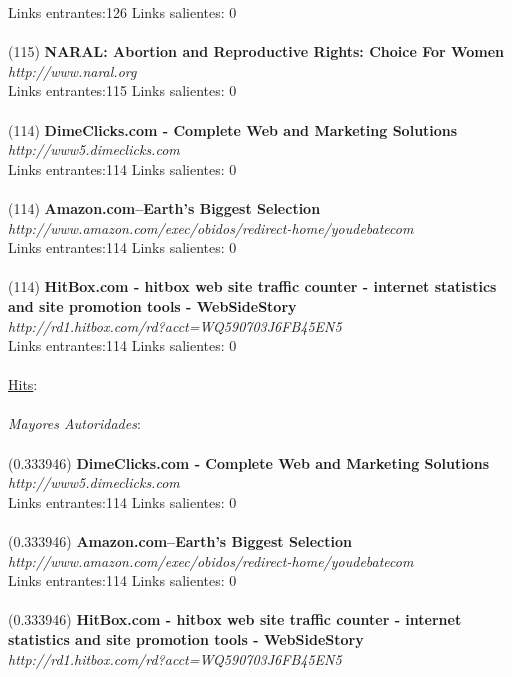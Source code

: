\documentclass[a4paper]{article}
\begin{document}
Links entrantes:126 \indent Links salientes: 0\\
\\
(115) \textbf{NARAL: Abortion and Reproductive Rights: Choice For Women} \\
\textit{http://www.naral.org }\\
Links entrantes:115 \indent Links salientes: 0\\
\\
(114) \textbf{DimeClicks.com - Complete Web and Marketing Solutions} \\
\textit{http://www5.dimeclicks.com }\\
Links entrantes:114 \indent Links salientes: 0\\
\\
(114)\textbf{ Amazon.com--Earth's Biggest Selection }\\
\textit{http://www.amazon.com/exec/obidos/redirect-home/youdebatecom} \\
Links entrantes:114 \indent Links salientes: 0\\
\\
(114) \textbf{HitBox.com - hitbox web site traffic counter - internet statistics and site promotion tools - WebSideStory} \\
\textit{http://rd1.hitbox.com/rd?acct=WQ590703J6FB45EN5} \\
Links entrantes:114 \indent Links salientes: 0\\
\\
\underline{Hits}: \\
\\
\emph{Mayores Autoridades}: \\
\\
(0.333946) \textbf{DimeClicks.com - Complete Web and Marketing Solutions} \\
\textit{http://www5.dimeclicks.com }\\
Links entrantes:114 \indent Links salientes: 0\\
\\
(0.333946) \textbf{Amazon.com--Earth's Biggest Selection} \\
\textit{http://www.amazon.com/exec/obidos/redirect-home/youdebatecom} \\
Links entrantes:114 \indent Links salientes: 0\\
\\
(0.333946) \textbf{HitBox.com - hitbox web site traffic counter - internet statistics and site promotion tools - WebSideStory} \\
\textit{http://rd1.hitbox.com/rd?acct=WQ590703J6FB45EN5} \\
\end{document}
